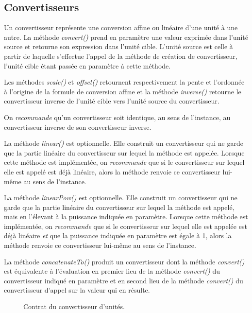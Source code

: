 \documentclass[a4paper,twoside,10pt]{article}
\begin{document}
\subsection{Convertisseurs}

Un convertisseur représente une conversion affine ou linéaire d'une unité à une autre. La méthode \emph{convert()} prend
en paramètre une valeur exprimée dans l'unité source et retourne son expression dans l'unité cible. L'unité source est
celle à partir de laquelle s'effectue l'appel de la méthode de création de convertisseur, l'unité cible étant passée en
paramètre à cette méthode.

Les méthodes \emph{scale()} et \emph{offset()} retournent respectivement la pente et l'ordonnée à l'origine de la
formule de conversion affine et la méthode \emph{inverse()} retourne le convertisseur inverse de l'unité
cible vers l'unité source du convertisseur.

On \emph{recommande} qu'un convertisseur soit identique, au sens de l'instance, au convertisseur inverse de son
convertisseur inverse.

La méthode \emph{linear()} est optionnelle. Elle construit un convertisseur qui ne garde que la partie linéaire du
convertisseur sur lequel la méthode est appelée. Lorsque cette méthode est implémentée, on \emph{recommande} que si le
convertisseur sur lequel elle est appelé est déjà linéaire, alors la méthode renvoie ce convertisseur lui-même au sens
de l'instance.

La méthode \emph{linearPow()} est optionnelle. Elle construit un convertisseur qui ne garde que la partie linéaire du
convertisseur sur lequel la méthode est appelé, mais en l'élevant à la puissance indiquée en paramètre. Lorsque cette
méthode est implémentée, on \emph{recommande} que si le convertisseur sur lequel elle est appelée est déjà linéaire
\emph{et} que la puissance indiquée en paramètre est égale à 1, alors la méthode renvoie ce convertisseur lui-même au
sens de l'instance.

La méthode \emph{concatenateTo()} produit un convertisseur dont la méthode \emph{convert()} est équivalente à
l'évaluation en premier lieu de la méthode \emph{convert()} du convertisseur indiqué en paramètre et en second lieu de
la méthode \emph{convert()} du convertisseur d'appel sur la valeur qui en résulte.

\begin{figure}[!h]
\caption{Contrat du convertisseur d'unités.}
\end{figure}
\end{document}
